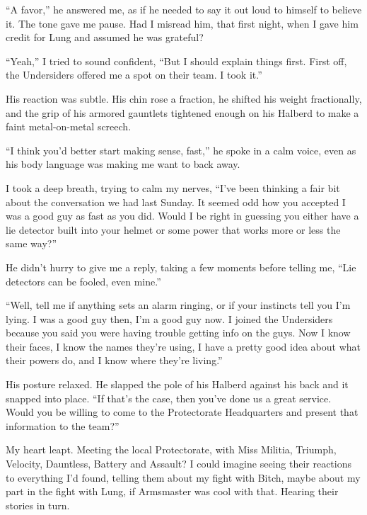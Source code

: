 





``A favor,'' he answered me, as if he needed to say it out loud to himself to believe it.  The tone gave me pause.  Had I misread him, that first night, when I gave him credit for Lung and assumed he was grateful?



``Yeah,'' I tried to sound confident, ``But I should explain things first.  First off, the Undersiders offered me a spot on their team.  I took it.''



His reaction was subtle.  His chin rose a fraction, he shifted his weight fractionally, and  the grip of his armored gauntlets tightened enough on his Halberd to make a faint metal-on-metal screech.



``I think you'd better start making sense, fast,'' he spoke in a calm voice, even as his body language was making me want to back away.



I took a deep breath, trying to calm my nerves, ``I've been thinking a fair bit about the conversation we had last Sunday.  It seemed odd how you accepted I was a good guy as fast as you did.  Would I be right in guessing you either have a lie detector built into your helmet or some power that works more or less the same way?''



He didn't hurry to give me a reply, taking a few moments before telling me, ``Lie detectors can be fooled, even mine.''



``Well, tell me if anything sets an alarm ringing, or if your instincts tell you I'm lying.  I was a good guy then, I'm a good guy now.  I joined the Undersiders because you said you were having trouble getting info on the guys.  Now I know their faces, I know the names they're using, I have a pretty good idea about what their powers do, and I know where they're living.''



His posture relaxed.  He slapped the pole of his Halberd against his back and it snapped into place.  ``If that's the case, then you've done us a great service.  Would you be willing to come to the Protectorate Headquarters and present that information to the team?''



My heart leapt.  Meeting the local Protectorate, with Miss Militia, Triumph, Velocity, Dauntless, Battery and Assault?  I could imagine seeing their reactions to everything I'd found, telling them about my fight with Bitch, maybe about my part in the fight with Lung, if Armsmaster was cool with that.  Hearing their stories in turn.



